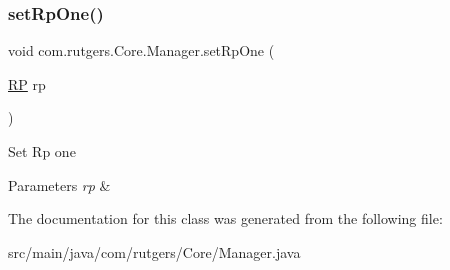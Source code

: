 \subsubsection{\texorpdfstring{set\+Rp\+One()}{setRpOne()}}
{\footnotesize\ttfamily void com.\+rutgers.\+Core.\+Manager.\+set\+Rp\+One (\begin{DoxyParamCaption}\item[{\hyperlink{classcom_1_1rutgers_1_1Core_1_1RP}{RP}}]{rp }\end{DoxyParamCaption})}

Set Rp one 
\begin{DoxyParams}{Parameters}
{\em rp} & \\
\hline
\end{DoxyParams}


The documentation for this class was generated from the following file\+:\begin{DoxyCompactItemize}
\item 
src/main/java/com/rutgers/\+Core/Manager.\+java\end{DoxyCompactItemize}
